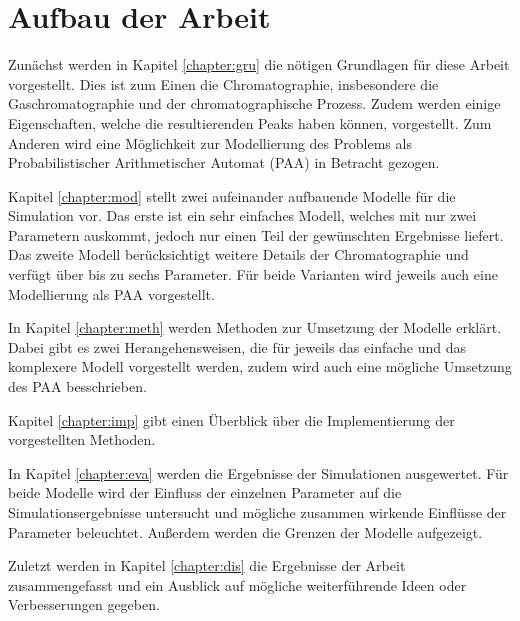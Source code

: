 \section{Aufbau der Arbeit}
Zunächst werden in Kapitel \ref{chapter:gru} die nötigen Grundlagen für diese Arbeit vorgestellt. Dies ist zum Einen die Chromatographie, insbesondere die Gaschromatographie und der chromatographische Prozess. Zudem werden einige Eigenschaften, welche die resultierenden Peaks haben können, vorgestellt. Zum Anderen wird eine Möglichkeit zur Modellierung des Problems als Probabilistischer Arithmetischer Automat (PAA) in Betracht gezogen.

Kapitel \ref{chapter:mod} stellt zwei aufeinander aufbauende Modelle für die Simulation vor. Das erste ist ein sehr einfaches Modell, welches mit nur zwei Parametern auskommt, jedoch nur einen Teil der gewünschten Ergebnisse liefert. Das zweite Modell berücksichtigt weitere Details der Chromatographie und verfügt über bis zu sechs Parameter. Für beide Varianten wird jeweils auch eine Modellierung als PAA vorgestellt.

In Kapitel \ref{chapter:meth} werden Methoden zur Umsetzung der Modelle erklärt. Dabei gibt es zwei Herangehensweisen, die für jeweils das einfache und das komplexere Modell vorgestellt werden, zudem wird auch eine mögliche Umsetzung des PAA besschrieben.

Kapitel \ref{chapter:imp} gibt einen Überblick über die Implementierung der vorgestellten Methoden. 

In Kapitel \ref{chapter:eva} werden die Ergebnisse der Simulationen ausgewertet. Für beide Modelle wird der Einfluss der einzelnen Parameter auf die Simulationsergebnisse untersucht und mögliche zusammen wirkende Einflüsse der Parameter beleuchtet. Außerdem werden die Grenzen der Modelle aufgezeigt.

Zuletzt werden in Kapitel \ref{chapter:dis} die Ergebnisse der Arbeit zusammengefasst und ein Ausblick auf mögliche weiterführende Ideen oder Verbesserungen gegeben.